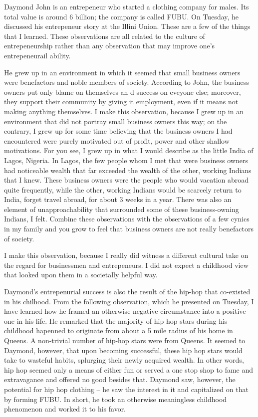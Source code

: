Daymond John is an entrepeneur who started a clothing company for males. Its total value is around 6 billion; the company is called FUBU. On Tuesday, he discussed his entrepeneur story at the Illini Union. These are a few of the things that I learned. These observations are all related to the culture of entrepeneurship rather than any observation that may improve one's entrepeneurail ability. 

He grew up in an environment in which it seemed that small business owners were benefactors and noble members of society. According to John, the business owners put only blame on themselves an d success on eveyone else; moreover, they support their community by giving it employment, even if it means not making anything themselves. I make this observation, because I grew up in an environment that did not portray small business owners this way; on the contrary, I grew up for some time believing that the business owners I had encountered were purely motivated out of profit, power and other shallow motivations. For you see, I grew up in what I would describe as the little India of Lagos, Nigeria. In Lagos, the few people whom I met that were business owners had noticeable wealth that far exceeded the wealth of the other, working Indians that I knew. These business owners were the people who would vacation abroad quite frequently, while the other, working Indians would be scarcely return to India, forget travel abroad, for about 3 weeks in a year. There was also an element of unapproachability that surrounded some of these business-owning Indians, I felt. Combine these observations with the observations of a few cynics in my family and you grow to feel that business owners are not really benefactors of society. 

I make this observation, because I really did witness a different cultural take on the regard for businessmen and entrepeneurs. I did not expect a childhood view that looked upon them in a societally helpful way.

Daymond's entrepenurial success is also the result of the hip-hop that co-existed in his chilhood. From the following observation, which he presented on Tuesday, I have learned how he framed an otherwise negative circumstance into a positive one in his life. He remarked that the majority of hip hop stars during his childhood hapenned to originate from about a 5 mile radius of his home in Queens. A non-trivial number of hip-hop stars were from Queens. It seemed to Daymond, however, that upon becoming successful, these hip hop stars would take to wasteful habits, splurging their newly acquired wealth. In other words, hip hop seemed only a means of either fun or served a one stop shop to fame and extravagance and offered no good besides that. Daymond saw, however, the potential for hip hop clothing -- he saw the interest in it and capitalized on that by forming FUBU. In short, he took an otherwise meaningless childhood phenomenon and worked it to his favor. 



